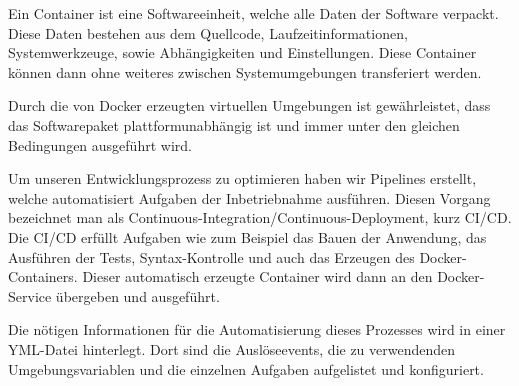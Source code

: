 Ein Container ist eine Softwareeinheit, welche alle Daten der Software verpackt. Diese Daten bestehen aus dem Quellcode, Laufzeitinformationen, Systemwerkzeuge, sowie Abhängigkeiten und Einstellungen. Diese Container können dann ohne weiteres zwischen Systemumgebungen transferiert werden.

Durch die von Docker erzeugten virtuellen Umgebungen ist gewährleistet, dass das Softwarepaket plattformunabhängig ist und immer unter den gleichen Bedingungen ausgeführt wird.

Um unseren Entwicklungsprozess zu optimieren haben wir Pipelines erstellt, welche automatisiert Aufgaben der Inbetriebnahme ausführen. Diesen Vorgang bezeichnet man als Continuous-Integration/Continuous-Deployment, kurz CI/CD. Die CI/CD erfüllt Aufgaben wie zum Beispiel das Bauen der Anwendung, das Ausführen der Tests, Syntax-Kontrolle und auch das Erzeugen des Docker-Containers. Dieser automatisch erzeugte Container wird dann an den Docker-Service übergeben und ausgeführt.

Die nötigen Informationen für die Automatisierung dieses Prozesses wird in einer YML-Datei hinterlegt. Dort sind die Auslöseevents, die zu verwendenden Umgebungsvariablen und die einzelnen Aufgaben aufgelistet und konfiguriert.
